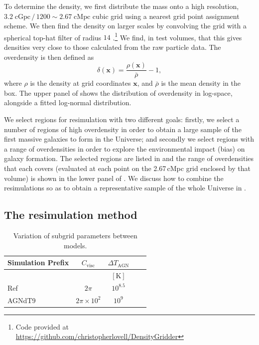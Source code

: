 To determine the density, we first distribute the mass onto a high resolution, $3.2 \; \mathrm{cGpc}\,/\,1200 \sim 2.67\; \mathrm{cMpc}$ cubic grid using a nearest grid point assignment scheme.
We then find the density on larger scales by convolving the grid with a spherical top-hat filter of radius $14$ \cMpch.\footnote{Code provided at \\\href{https://github.com/christopherlovell/DensityGridder}{https://github.com/christopherlovell/DensityGridder}}
We find, in test volumes, that this gives densities very close to those calculated from the raw particle data.
The overdensity is then defined as
\begin{equation}\label{eq:1}
	\delta(\textbf{x}) = \frac{\rho(\textbf{x})}{\bar\rho} - 1,
\end{equation}
where $\rho$ is the density at grid coordinates $\textbf{x}$, and $\bar\rho$ is the mean density in the box.
The upper panel of  shows the distribution of overdensity in log-space, alongside a fitted log-normal distribution.

We select regions for resimulation with two different goals: firstly, we select a number of regions of high overdensity in order to obtain a large sample of the first massive galaxies to form in the Universe; and secondly we select regions with a range of overdensities in order to explore the environmental impact (bias) on galaxy formation.
The selected regions are listed in  and the range of overdensities that each covers (evaluated at each point on the 2.67\,cMpc grid enclosed by that volume) is shown in the lower panel of .
We discuss how to combine the resimulations so as to obtain a representative sample of the whole Universe in .


\subsection{The resimulation method}
\label{sec:method:resim}

\begin{table}
	\centering
	\caption{Variation of subgrid parameters between models. }
	\label{tab:example_table}
	\begin{tabular}{lcccc}
		\hline
		\textbf{Simulation Prefix} & $C_{\mathrm{visc}}$ & $\Delta T_{\mathrm{AGN}}$\\
		\hline
      & & $\mathrm{[K]}$ \\
		\hline
		Ref & $2 \pi$ & $10^{8.5}$ \\
		AGNdT9 & $2 \pi \times 10^{2}$ & $10^{9}$ \\
		\hline
	\end{tabular}
\end{table}


